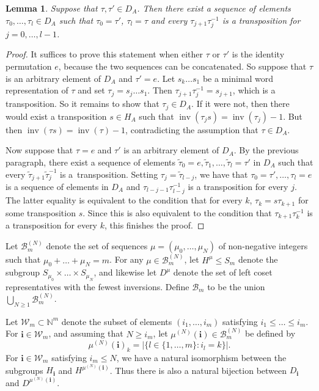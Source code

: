 \documentclass[pdftex]{sigma}
\numberwithin{equation}{section}
\newtheorem{Lemma}[Theorem]{Lemma}
\DeclareMathOperator{\inv}{inv}
\newcommand{\ii}{{\mathbf{i}}}
\begin{document}
 \begin{Lemma}\label{Gene}
 	Suppose that $\tau,\tau' \in D_A$. Then there exist a sequence of elements $\tau_0,\dots,\tau_l\in D_A$ such that $\tau_0 = \tau'$, $\tau_l=\tau$ and every $\tau_{j+1}\tau_j^{-1}$ is a transposition for $j=0,\dots,l-1$.
 \end{Lemma}
 \begin{proof}
 	It suffices to prove this statement when either $\tau$ or $\tau'$ is the identity permutation $e$, because the two sequences can be concatenated. So suppose that $\tau$ is an arbitrary element of $D_A$ and $\tau'=e$. Let $s_k\dots s_1$ be a minimal word representation of $\tau$ and set $\tau_j = s_j \dots s_1$. Then $\tau_{j+1}\tau_j^{-1}=s_{j+1}$, which is a transposition. So it remains to show that $\tau_j \in D_A$. If it were not, then there would exist a transposition $s\in H_A$ such that $\inv(\tau_js) = \inv(\tau_j)-1$. But then $\inv(\tau s) = \inv(\tau)-1$, contradicting the assumption that $\tau \in D_A$.
 	
 	Now suppose that $\tau=e$ and $\tau'$ is an arbitrary element of $D_A$. By the previous paragraph, there exist a sequence of elements $\tilde{\tau}_0=e,\tilde{\tau}_1,\dots,\tilde{\tau}_l=\tau'$ in $D_A$ such that every $\tilde{\tau}_{j+1}\tilde{\tau}_j^{-1}$ is a~transposition. Setting $\tau_j = \tilde{\tau}_{l-j}$, we have that $\tau_0=\tau',\dots,\tau_l=e$ is a sequence of elements in $D_A$ and ${\tau}_{l-j-1}{\tau}_{l-j}^{-1}$ is a transposition for every $j$. The latter equality is equivalent to the condition that for every $k$, $\tau_k = s\tau_{k+1}$ for some transposition $s$. Since this is also equivalent to the condition that $\tau_{k+1}\tau_k^{-1}$ is a transposition for every $k$, this finishes the proof.
 \end{proof}

 Let $ \mathcal{B}_m^{(N)} $ denote the set of sequences $ \mu=(\mu_0,\dots,\mu_N) $ of non-negative integers such that $ \mu_0+\dots+\mu_N=m $. For any $ \mu \in \mathcal{B}_m^{(N)} $, let $ H^\mu \le S_m$ denote the subgroup $ S_{\mu_0}\times \dots \times S_{\mu_N} $, and likewise let $ D^\mu $ denote the set of left coset representatives with the fewest inversions. Define $\mathcal{B}_m$ to be the union $\bigcup_{N\geq 1} \mathcal{B}_m^{(N)}$.

Let $\mathcal{W}_m \subset \mathbb{N}^m$ denote the subset of elements $(i_1,\dots,i_m)$ satisfying $i_1 \leq \dots \leq i_m$. For $\ii \in \mathcal{W}_m$, and assuming that $N\geq i_m$, let $\mu^{(N)}(\ii) \in \mathcal{B}_m^{(N)}$ be defined by
\[
\mu^{(N)}(\ii)_k = \vert \{ l \in \{1,\dots,m\}\colon i_l=k \} \vert.
\]
For $\ii \in \mathcal{W}_m$ satisfying $i_m \leq N$, we have a natural isomorphism between the subgroups $H_{\ii}$ and $H^{\mu^{(N)}(\ii)}$. Thus there is also a natural bijection between $D_{\ii}$ and $D^{\mu^{(N)}(\ii)}$.
\end{document}
